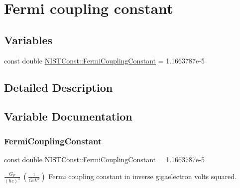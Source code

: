 \hypertarget{group___fermi_coupling_constant}{}\section{Fermi coupling constant}
\label{group___fermi_coupling_constant}
\subsection*{Variables}
\begin{DoxyCompactItemize}
\item 
const double \hyperlink{group___fermi_coupling_constant_ga0348e7c9835697c05fa7f68029bfb15a}{N\+I\+S\+T\+Const\+::\+Fermi\+Coupling\+Constant} = 1.\+1663787e-\/5
\end{DoxyCompactItemize}


\subsection{Detailed Description}


\subsection{Variable Documentation}
\mbox{\label{group___fermi_coupling_constant_ga0348e7c9835697c05fa7f68029bfb15a}} 
\subsubsection{\texorpdfstring{Fermi\+Coupling\+Constant}{FermiCouplingConstant}}
{\footnotesize\ttfamily const double N\+I\+S\+T\+Const\+::\+Fermi\+Coupling\+Constant = 1.\+1663787e-\/5}

$\frac{G_F}{(\hbar c)^3} \ (\frac{1}{GeV^2})$ Fermi coupling constant in inverse gigaelectron volts squared. 